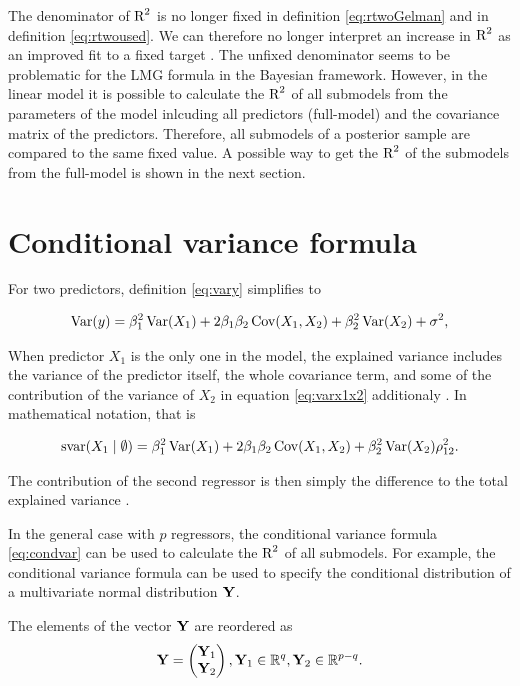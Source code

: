 \documentclass[11pt,a4paper,twoside]{book}
\begin{document}
The denominator of $\text{R}^2$ is no longer fixed in definition \eqref{eq:rtwoGelman} and in definition \eqref{eq:rtwoused}. We can therefore no longer interpret an increase in $\text{R}^2$ as an improved fit to a fixed target \citep{Gelman2017}. The unfixed denominator seems to be problematic for the LMG formula in the Bayesian framework. However, in the linear model it is possible to calculate the $\text{R}^2$ of all submodels from the parameters of the model inlcuding all predictors (full-model) and the covariance matrix of the predictors. Therefore,  all submodels of a posterior sample are compared to the same fixed value. A possible way to get the $\text{R}^2$ of the submodels from the full-model is shown in the next section.

\section{Conditional variance formula}


For two predictors, definition \eqref{eq:vary} simplifies to

      \begin{align} 
        \operatorname{Var}(y) = \beta_{1}^2 \operatorname{Var}(X_{1}) + 2  \beta_{1}  \beta_{2} \operatorname{Cov}(X_{1}, X_{2}) + \beta_{2}^2 \operatorname{Var}(X_{2}) + \sigma^2, \label{eq:varx1x2} 
   \end{align}
 
 When predictor $X_{1}$ is the only one in the model, the explained variance includes the variance of the predictor itself, the whole covariance term, and some of the contribution of the variance of $X_{2}$ in equation \eqref{eq:varx1x2} additionaly . In mathematical notation, that is
 
      \begin{align} 
        \text{svar}({X_{1}} \mid \emptyset ) = \beta_{1}^2 \operatorname{Var}(X_{1}) + 2  \beta_{1}  \beta_{2} \operatorname{Cov}(X_{1}, X_{2}) + \beta_{2}^2 \operatorname{Var}(X_{2}) \rho_{12}^2 \text{.} \nonumber 
   \end{align}
   
The contribution of the second regressor is then simply the difference to the total explained variance \citep{Gromping2007}. 

In the general case with $p$ regressors, the conditional variance formula \eqref{eq:condvar} can be used to calculate the $\text{R}^2$ of all submodels. For example, the conditional variance formula can be used to specify the conditional distribution of a multivariate normal distribution ${\mathbf{Y}}$.

The elements of the vector ${\mathbf{Y}}$ are reordered as
\begin{align*}
\mathbf{Y} = \begin{pmatrix}
\mathbf{Y}_{1} \\ 
\mathbf{Y}_{2} \end{pmatrix}, \mathbf{Y}_{1} \in {\mathbb{R}}^q, \mathbf{Y}_{2} \in {\mathbb{R}}^{p-q} .
\end{align*}
\end{document}
